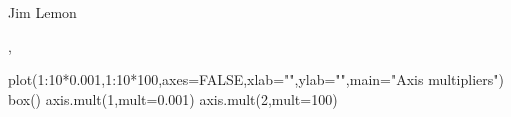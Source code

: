 \begin{Author}\relax
Jim Lemon
\end{Author}
\begin{SeeAlso}\relax
{}, 
\end{SeeAlso}
\begin{Examples}
\begin{ExampleCode}
 plot(1:10*0.001,1:10*100,axes=FALSE,xlab="",ylab="",main="Axis multipliers")
 box()
 axis.mult(1,mult=0.001)
 axis.mult(2,mult=100)
\end{ExampleCode}
\end{Examples}

